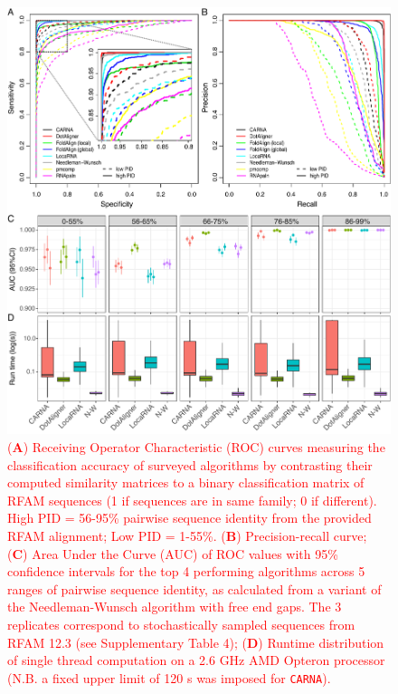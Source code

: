 \documentclass{bmcart}
\newcommand\carna{\texttt{CARNA}}
\begin{document}
\begin{backmatter}
\begin{figure}[h!]
 \includegraphics[width=\textwidth]{fig3}
 \caption {
  \textcolor{red} {
 (\textbf{A}) Receiving Operator Characteristic (ROC) curves measuring the classification
 accuracy of surveyed algorithms by contrasting their computed similarity matrices 
 to a binary classification matrix of RFAM  sequences (1 if sequences are in same family; 
 0 if different). High PID =  56-95\% pairwise sequence identity from the provided RFAM alignment; Low PID  = 1-55\%.
 (\textbf{B}) Precision-recall curve;  
 (\textbf{C}) Area Under the Curve (AUC) of ROC values with 95\% confidence intervals 
for the top 4 performing algorithms across 5 ranges of pairwise sequence identity, 
 as calculated from a variant of the Needleman-Wunsch algorithm with free end gaps. 
 The 3 replicates correspond to stochastically sampled sequences from RFAM 12.3  (see Supplementary Table 4); 
 (\textbf{D}) Runtime distribution of single thread computation on a 2.6 GHz AMD Opteron processor 
 (N.B. a fixed upper limit of 120 s was  imposed for \carna{}). }  }
\end{figure}



\end{backmatter}
\end{document}
